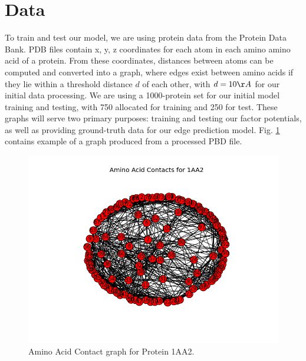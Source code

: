 \documentclass{article}
\begin{document}

\section{Data}
	To train and test our model, we are using protein data from the Protein Data Bank. PDB files contain x, y, z coordinates for each atom in each amino amino acid of a protein. From these coordinates, distances between atoms can be computed and converted into a graph, where edges exist between amino acids if they lie within a threshold distance $d$ of each other, with $d = 10 {\AA}$ for our initial data processing. We are using a 1000-protein set for our initial model training and testing, with 750 allocated for training and 250 for test. These graphs will serve two primary purposes: training and testing our factor potentials, as well as providing ground-truth data for our edge prediction model. Fig. \ref{fig:contactgraph} contains example of a graph produced from a processed PBD file. 

\begin{figure}
\centering
\includegraphics[scale=0.3]{1aa2_plot.png}
\caption{Amino Acid Contact graph for Protein 1AA2.}
\label{fig:contactgraph}
\end{figure}
 
\end{document}
